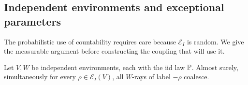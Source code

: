 \subsection{Independent environments and exceptional parameters}

The probabilistic use of countability requires care because
$\mathcal E_I$ is random.  We give the measurable argument before
constructing the coupling that will use it.

\begin{lemma}
\label{lem:independent-exceptional}
Let $V,W$ be independent environments, each with the iid law $\mathbb P$.
Almost surely, simultaneously for every $\rho\in\mathcal E_I(V)$,
all $W$-rays of label $-\rho$ coalesce.
\end{lemma}

